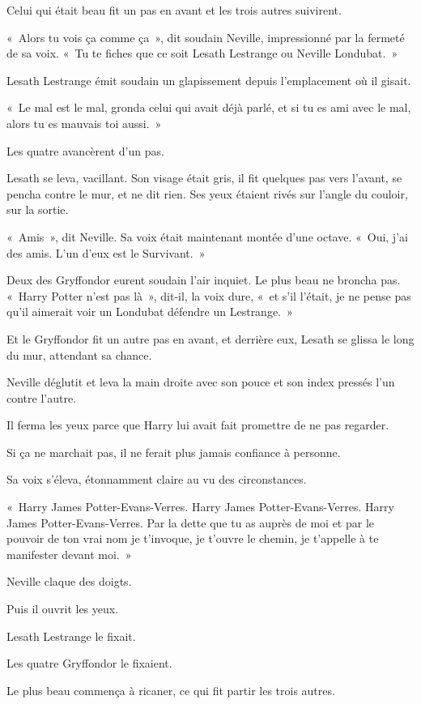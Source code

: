 Celui qui était beau fit un pas en avant et les trois autres suivirent.

«~Alors tu vois ça comme ça~», dit soudain Neville, impressionné par la fermeté de sa voix.
«~Tu te fiches que ce soit Lesath Lestrange ou Neville Londubat.~»

Lesath Lestrange émit soudain un glapissement depuis l'emplacement où il gisait.

«~Le mal est le mal, gronda celui qui avait déjà parlé, et si tu es ami avec le mal, alors tu es mauvais toi aussi.~»

Les quatre avancèrent d'un pas.

Lesath se leva, vacillant.
Son visage était gris, il fit quelques pas vers l'avant, se pencha contre le mur, et ne dit rien.
Ses yeux étaient rivés sur l'angle du couloir, sur la sortie.

«~Amis~», dit Neville.
Sa voix était maintenant montée d'une octave.
«~Oui, j'ai des amis.
L'un d'eux est le Survivant.~»

Deux des Gryffondor eurent soudain l'air inquiet.
Le plus beau ne broncha pas.
«~Harry Potter n'est pas là~», dit-il, la voix dure, «~et s'il l'était, je ne pense pas qu'il aimerait voir un Londubat défendre un Lestrange.~»

Et le Gryffondor fit un autre pas en avant, et derrière eux, Lesath se glissa le long du mur, attendant sa chance.

Neville déglutit et leva la main droite avec son pouce et son index pressés l'un contre l'autre.

Il ferma les yeux parce que Harry lui avait fait promettre de ne pas regarder.

Si ça ne marchait pas, il ne ferait plus jamais confiance à personne.

Sa voix s'éleva, étonnamment claire au vu des circonstances.

«~Harry James Potter-Evans-Verres.
Harry James Potter-Evans-Verres.
Harry James Potter-Evans-Verres.
Par la dette que tu as auprès de moi et par le pouvoir de ton vrai nom je t'invoque, je t'ouvre le chemin, je t'appelle à te manifester devant moi.~»

Neville claque des doigts.

Puis il ouvrit les yeux.

Lesath Lestrange le fixait.

Les quatre Gryffondor le fixaient.

Le plus beau commença à ricaner, ce qui fit partir les trois autres.

